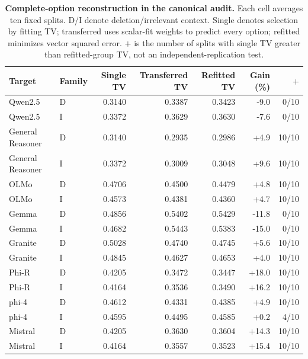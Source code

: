\begin{table}[!b]
\centering\small\setlength{\tabcolsep}{5pt}
\caption{\textbf{Complete-option reconstruction in the canonical audit.} Each cell averages ten fixed splits. D/I denote deletion/irrelevant context. Single denotes selection by fitting TV; transferred uses scalar-fit weights to predict every option; refitted minimizes vector squared error. $+$ is the number of splits with single TV greater than refitted-group TV, not an independent-replication test.}
\label{tab:vector-all}
\begin{tabular}{llrrrrr}
\toprule
Target & Family & Single TV & Transferred TV & Refitted TV & Gain (\%) & $+$\\
\midrule
Qwen2.5 & D & 0.3140 & 0.3387 & 0.3423 & -9.0 & 0/10\\
Qwen2.5 & I & 0.3372 & 0.3629 & 0.3630 & -7.6 & 0/10\\
General Reasoner & D & 0.3140 & 0.2935 & 0.2986 & +4.9 & 10/10\\
General Reasoner & I & 0.3372 & 0.3009 & 0.3048 & +9.6 & 10/10\\
OLMo & D & 0.4706 & 0.4500 & 0.4479 & +4.8 & 10/10\\
OLMo & I & 0.4573 & 0.4381 & 0.4360 & +4.7 & 10/10\\
Gemma & D & 0.4856 & 0.5402 & 0.5429 & -11.8 & 0/10\\
Gemma & I & 0.4682 & 0.5443 & 0.5383 & -15.0 & 0/10\\
Granite & D & 0.5028 & 0.4740 & 0.4745 & +5.6 & 10/10\\
Granite & I & 0.4845 & 0.4627 & 0.4653 & +4.0 & 10/10\\
Phi-R & D & 0.4205 & 0.3472 & 0.3447 & +18.0 & 10/10\\
Phi-R & I & 0.4164 & 0.3536 & 0.3490 & +16.2 & 10/10\\
phi-4 & D & 0.4612 & 0.4331 & 0.4385 & +4.9 & 10/10\\
phi-4 & I & 0.4595 & 0.4495 & 0.4585 & +0.2 & 4/10\\
Mistral & D & 0.4205 & 0.3630 & 0.3604 & +14.3 & 10/10\\
Mistral & I & 0.4164 & 0.3557 & 0.3523 & +15.4 & 10/10\\
\bottomrule
\end{tabular}
\end{table}
